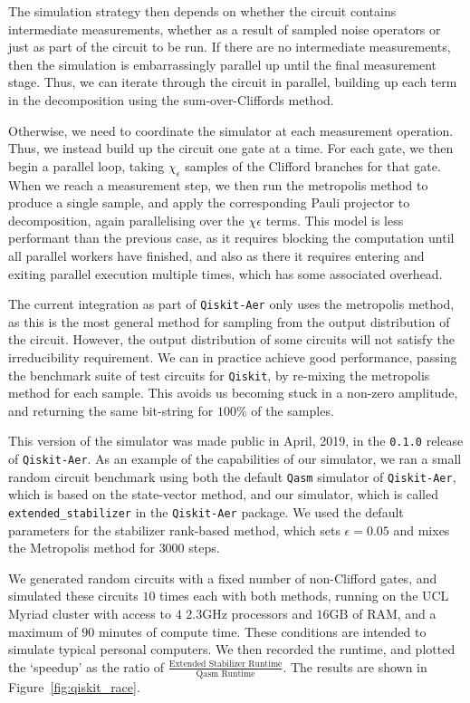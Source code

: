 The simulation strategy then depends on whether the circuit contains intermediate measurements, whether as a result of sampled noise operators or just as part of the circuit to be run. If there are no intermediate measurements, then the simulation is embarrassingly parallel up until the final measurement stage. Thus, we can iterate through the circuit in parallel, building up each term in the decomposition using the sum-over-Cliffords method.\par
Otherwise, we need to coordinate the simulator at each measurement operation. Thus, we instead build up the circuit one gate at a time. For each gate, we then begin a parallel loop, taking $\chi_{\epsilon}$ samples of the Clifford branches for that gate. When we reach a measurement step, we then run the metropolis method to produce a single sample, and apply the corresponding Pauli projector to decomposition, again parallelising over the $\chi{\epsilon}$ terms. This model is less performant than the previous case, as it requires blocking the computation until all parallel workers have finished, and also as there it requires entering and exiting parallel execution multiple times, which has some associated overhead.\par
The current integration as part of \texttt{Qiskit-Aer} only uses the metropolis method, as this is the most general method for sampling from the output distribution of the circuit. However, the output distribution of some circuits will not satisfy the irreducibility requirement. We can in practice achieve good performance, passing the benchmark suite of test circuits for \texttt{Qiskit}, by re-mixing the metropolis method for each sample. This avoids us becoming stuck in a non-zero amplitude, and returning the same bit-string for $100\%$ of the samples.\par
This version of the simulator was made public in April, 2019, in the \texttt{0.1.0} release of \texttt{Qiskit-Aer}. As an example of the capabilities of our simulator, we ran a small random circuit benchmark using both the default \texttt{Qasm} simulator of \texttt{Qiskit-Aer}, which is based on the state-vector method, and our simulator, which is called \texttt{extended\_stabilizer} in the \texttt{Qiskit-Aer} package. We used the default parameters for the stabilizer rank-based method, which sets $\epsilon=0.05$ and mixes the Metropolis method for $3000$ steps.\par
We generated random circuits with a fixed number of non-Clifford gates, and simulated these circuits $10$ times each with both methods, running on the UCL Myriad cluster with access to $4$ $2.3\mathrm{GHz}$ processors and $16\mathrm{GB}$ of RAM, and a maximum of $90$ minutes of compute time. These conditions are intended to simulate typical personal computers. We then recorded the runtime, and plotted the `speedup' as the ratio of $\frac{\text{Extended Stabilizer Runtime}}{\text{Qasm Runtime}}$. The results are shown in Figure~\ref{fig:qiskit_race}.
